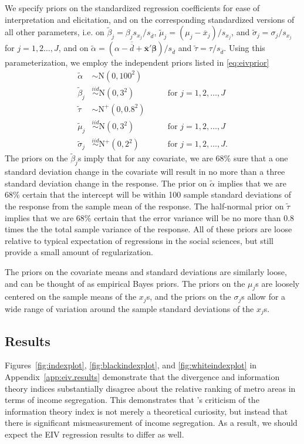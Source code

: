 \documentclass[12pt]{article}
\begin{document}
We specify priors on the standardized regression coefficients for ease of interpretation and elicitation, and on the corresponding standardized versions of all other parameters, i.e. on $\widetilde{\beta}_j = \beta_j s_{x_j} / s_{\overline{d}}$, $\widetilde{\mu}_j = (\mu_j - \overline{x}_j)/s_{x_j}$, and $\widetilde{\sigma}_j = \sigma_j / s_{x_j}$ for $j=1,2\dots,J$, and on $\widetilde{\alpha} = (\alpha - \overline{\overline{d}} + \overline{\bm{x}}'\bm{\beta}) / s_{\overline{d}}$ and $\widetilde{\tau} = \tau / s_{\overline{d}}$. Using this parameterization, we employ the independent priors listed in \eqref{eq:eivprior} 
\begin{align}
  \widetilde{\alpha} &\sim \mathrm{N}(0, 100^2) &&& \nonumber\\
  \widetilde{\beta}_j &\stackrel{iid}{\sim} \mathrm{N}(0, 3^2) &&& \mbox{ for } j=1,2,\dots,J \nonumber\\
  \widetilde{\tau} & \sim \mathrm{N}^+(0, 0.8^2) &&&\nonumber\\
  \widetilde{\mu}_j & \stackrel{iid}{\sim} \mathrm{N}(0, 3^2) &&& \mbox{ for } j=1,2,\dots,J\nonumber\\
  \widetilde{\sigma}_j & \stackrel{iid}{\sim} \mathrm{N}^+(0, 2^2) &&& \mbox{ for } j=1,2,\dots,J. \label{eq:eivprior}
\end{align}
The priors on the $\widetilde{\beta}_j$s imply that for any covariate, we are 68\% sure that a one standard deviation change in the covariate will result in no more than a three standard deviation change in the response. The prior on $\widetilde{\alpha}$ implies that we are 68\% certain that the intercept will be within 100 sample standard deviations of the response from the sample mean of the response. The half-normal prior on $\widetilde{\tau}$ implies that we are 68\% certain that the error variance will be no more than $0.8$ times the the total sample variance of the response. All of these priors are loose relative to typical expectation of regressions in the social sciences, but still provide a small amount of regularization.

The priors on the covariate means and standard deviations are similarly loose, and can be thought of as empirical Bayes priors. The priors on the $\mu_j$s are loosely centered on the sample means of the $x_j$s, and the priors on the $\sigma_j$s allow for a wide range of variation around the sample standard deviations of the $x_j$s.

\subsection{Results}\label{sec:results}
Figures~\ref{fig:indexplot}, \ref{fig:blackindexplot}, and \ref{fig:whiteindexplot} in Appendix~\ref{app:eiv.results} demonstrate that the divergence and information theory indices substantially disagree about the relative ranking of metro areas in terms of income segregation. This demonstrates that \citet{roberto2015divergence}'s criticism of the information theory index is not merely a theoretical curiosity, but instead that there is significant mismeasurement of income segregation. As a result, we should expect the EIV regression results to differ as well.
\end{document}
